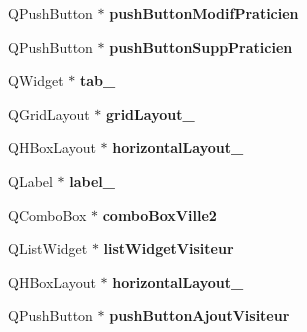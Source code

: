 \begin{DoxyCompactItemize}
\item 
\hypertarget{classUi__MainWindow_a0108696055b1d904392f786189b72f24}{Q\-Push\-Button $\ast$ {\bfseries push\-Button\-Modif\-Praticien}}\label{classUi__MainWindow_a0108696055b1d904392f786189b72f24}

\item 
\hypertarget{classUi__MainWindow_a0df202c7a836fece1576489a5d170e0e}{Q\-Push\-Button $\ast$ {\bfseries push\-Button\-Supp\-Praticien}}\label{classUi__MainWindow_a0df202c7a836fece1576489a5d170e0e}

\item 
\hypertarget{classUi__MainWindow_a41c7e77dd12b9445e13dbe8fb5ae1488}{Q\-Widget $\ast$ {\bfseries tab\-\_}}\label{classUi__MainWindow_a41c7e77dd12b9445e13dbe8fb5ae1488}

\item 
\hypertarget{classUi__MainWindow_a8731b71c513ff94baf59614807823c5d}{Q\-Grid\-Layout $\ast$ {\bfseries grid\-Layout\-\_}}\label{classUi__MainWindow_a8731b71c513ff94baf59614807823c5d}

\item 
\hypertarget{classUi__MainWindow_a14c9d4842c3e97e16e7873ef0aecdb1e}{Q\-H\-Box\-Layout $\ast$ {\bfseries horizontal\-Layout\-\_}}\label{classUi__MainWindow_a14c9d4842c3e97e16e7873ef0aecdb1e}

\item 
\hypertarget{classUi__MainWindow_a0376fd90247280e7c7957cc70628708c}{Q\-Label $\ast$ {\bfseries label\-\_}}\label{classUi__MainWindow_a0376fd90247280e7c7957cc70628708c}

\item 
\hypertarget{classUi__MainWindow_a048d3f935a966a97e10e122cb4f5b18c}{Q\-Combo\-Box $\ast$ {\bfseries combo\-Box\-Ville2}}\label{classUi__MainWindow_a048d3f935a966a97e10e122cb4f5b18c}

\item 
\hypertarget{classUi__MainWindow_afb925f4fee1eccabbcf71e8a2523aca9}{Q\-List\-Widget $\ast$ {\bfseries list\-Widget\-Visiteur}}\label{classUi__MainWindow_afb925f4fee1eccabbcf71e8a2523aca9}

\item 
\hypertarget{classUi__MainWindow_a1351e317cba7ca711b6b4d2212b6bf36}{Q\-H\-Box\-Layout $\ast$ {\bfseries horizontal\-Layout\-\_}}\label{classUi__MainWindow_a1351e317cba7ca711b6b4d2212b6bf36}

\item 
\hypertarget{classUi__MainWindow_a016864ffa110d63b5c6a9208b9e787ed}{Q\-Push\-Button $\ast$ {\bfseries push\-Button\-Ajout\-Visiteur}}\label{classUi__MainWindow_a016864ffa110d63b5c6a9208b9e787ed}


\end{DoxyCompactItemize}
